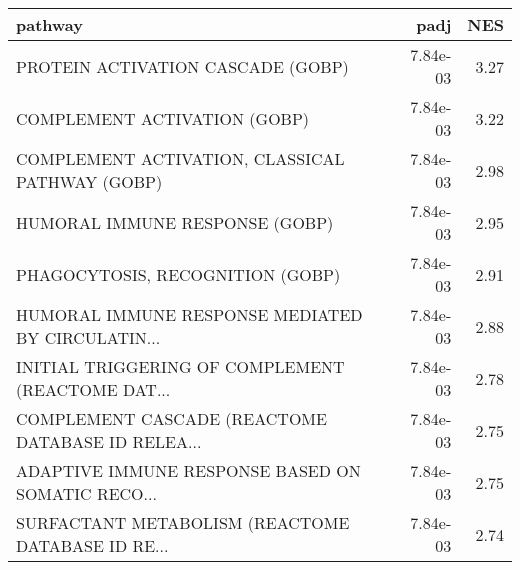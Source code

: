 \begin{tabular}{lrr}
\toprule
                                           pathway &      padj &   NES \\
\midrule
                 PROTEIN ACTIVATION CASCADE (GOBP) &  7.84e-03 &  3.27 \\
                      COMPLEMENT ACTIVATION (GOBP) &  7.84e-03 &  3.22 \\
   COMPLEMENT ACTIVATION, CLASSICAL PATHWAY (GOBP) &  7.84e-03 &  2.98 \\
                    HUMORAL IMMUNE RESPONSE (GOBP) &  7.84e-03 &  2.95 \\
                  PHAGOCYTOSIS, RECOGNITION (GOBP) &  7.84e-03 &  2.91 \\
 HUMORAL IMMUNE RESPONSE MEDIATED BY CIRCULATIN... &  7.84e-03 &  2.88 \\
 INITIAL TRIGGERING OF COMPLEMENT (REACTOME DAT... &  7.84e-03 &  2.78 \\
 COMPLEMENT CASCADE (REACTOME DATABASE ID RELEA... &  7.84e-03 &  2.75 \\
 ADAPTIVE IMMUNE RESPONSE BASED ON SOMATIC RECO... &  7.84e-03 &  2.75 \\
 SURFACTANT METABOLISM (REACTOME DATABASE ID RE... &  7.84e-03 &  2.74 \\
\bottomrule
\end{tabular}
